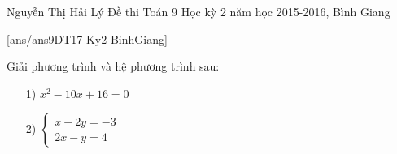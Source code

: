 
\begin{name}
{Nguyễn Thị Hải Lý}
{Đề thi Toán 9 Học kỳ 2 năm học 2015-2016, Bình Giang }
\end{name}
\setcounter{ex}{0}
[ans/ans9DT17-Ky2-BinhGiang]
\begin{ex}%
	Giải phương trình và hệ phương trình sau:
	\begin{itemize}
	\item[1)] $x^2-10x+16=0$
	\item[2)] $\begin{cases} x+2y=-3\\ 2x-y=4 \end{cases}$
	\end{itemize}
\end{ex}

